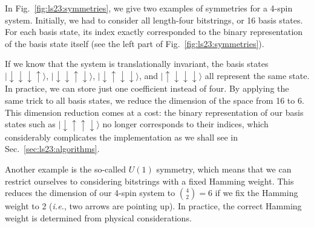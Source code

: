 In Fig.~\ref{fig:ls23:symmetries}, we give two examples of symmetries for a 4-spin system. Initially, we had to consider all length-four bitstrings, or 16 basis states. For each basis state, its index exactly corresponded to the binary representation of the basis state itself (see the left part of Fig.~\ref{fig:ls23:symmetries}).

If we know that the system is translationally invariant, the basis states $|\downarrow\downarrow\downarrow\uparrow\rangle$, $|\downarrow\downarrow\uparrow\downarrow\rangle$, $|\downarrow\uparrow\downarrow\downarrow\rangle$, and $|\uparrow\downarrow\downarrow\downarrow\rangle$ all represent the same state. In practice, we can store just one coefficient instead of four. By applying the same trick to all basis states, we reduce the dimension of the space from 16 to 6. This dimension reduction comes at a cost: the binary representation of our basis states such as $|\downarrow\uparrow\uparrow\downarrow\rangle$ no longer corresponds to their indices, which considerably complicates the implementation as we shall see in Sec.~\ref{sec:ls23:algorithms}.

Another example is the so-called $U(1)$ symmetry, which means that we can restrict ourselves to considering bitstrings with a fixed Hamming weight. This reduces the dimension of our 4-spin system to $\binom{4}{2}=6$ if we fix the Hamming weight to 2 (\textit{i.e.}, two arrows are pointing up). In practice, the correct Hamming weight is determined from physical considerations.

